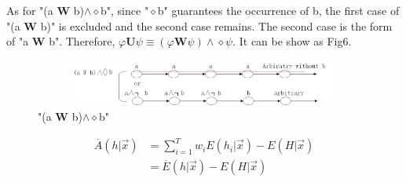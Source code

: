 \documentclass[10pt]{llncs}
\begin{document}
       As for "(a \textbf{W} b)$\wedge\diamond$b", since "$\diamond$b" guarantees the occurrence of b, the first case of "(a \textbf{W} b)" is excluded and the second case remains. The second case is the form of "a \textbf{W} b". Therefore, $\varphi\textbf{U}\psi \equiv (\varphi\textbf{W}\psi)\wedge\diamond\psi$. It can be show as Fig6.
    \begin{figure}[H]
      \centering
      \includegraphics[width=5.0in,height=0.6in]{6.png}
      \caption{"(a \textbf{W} b)$\wedge\diamond$b"}
    \end{figure}

    \begin{equation}\label{8.31}
                  \begin{split}
                     \overline{A}(h|\vec{x}) & =\sum_{i=1}^{T}w_iE(h_i|\vec{x})-E(H|\vec{x}) \\
                       & =\overline{E}(h|\vec{x})-E(H|\vec{x})
                  \end{split}
                \end{equation}
\end{document}
